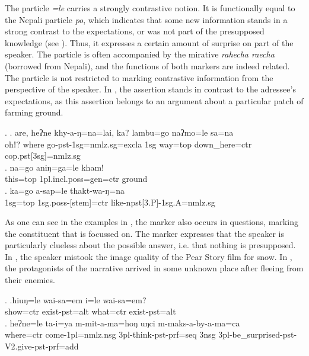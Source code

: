 The particle  \emph{=le} carries a strongly contrastive notion. It is functionally equal to the Nepali particle \emph{po}, which indicates that some new information stands in a strong contrast to the expectations, or was not part of the presupposed knowledge (see \Next[a]). Thus, it expresses a certain amount of surprise on part of the speaker. The particle is often accompanied by the mirative \emph{rahecha \ti raecha} (borrowed from Nepali), and the functions of both markers are indeed related. The particle is not restricted to marking contrastive information from the perspective of the speaker. In \Next[b], the assertion stands in contrast to the adressee's expectations, as this assertion belongs to an argument about a particular patch of farming ground. 

\ex. \ag. are,   heʔne khy-a-ŋ=na=lai,        ka? lambu=go     naʔmo=le             sa=na\\
ohǃ?  where  go{\sc -pst-1sg=nmlz.sg=excla} {\sc 1sg} way{\sc =top} down\_here{\sc =ctr} {\sc cop.pst[3sg]=nmlz.sg}\\
\bg. na=go       aniŋ=ga=le   kham!\\
this{\sc =top} {\sc 1pl.incl.poss=gen=ctr} ground\\
 
\bg. ka=go a-sap=le thakt-wa-ŋ=na\\
{\sc 1sg=top} {\sc 1sg.poss-[stem]=ctr} like{\sc -npst[3.P]-1sg.A=nmlz.sg}\\

As one can see in the examples in \Next, the marker also occurs in questions, marking the constituent that is focussed on. The marker expresses that the speaker is particularly clueless about the possible answer, i.e. that nothing is presupposed. In \Next[a], the speaker mistook the image quality of the Pear Story film \citep{Chafe1980The-Pear} for snow. In \Next[b], the protagonists of the narrative arrived in some unknown place after fleeing from their enemies. 
 
\ex. \ag.hiuŋ=le wai-sa=em  i=le wai-sa=em?\\
show{\sc =ctr} exist{\sc [3sg]-pst=alt} what{\sc =ctr} exist{\sc [3sg]-pst=alt} \\
 
\bg. heʔne=le   ta-i=ya   m-mit-a-ma=hoŋ  uŋci m-maks-a-by-a-ma=ca\\
where{\sc =ctr} come{\sc -1pl=nmlz.nsg} {\sc 3pl-}think{\sc -pst-prf=seq} {\sc 3nsg} {\sc 3pl-}be\_surprised{\sc -pst-V2.give-pst-prf=add}\\
 


